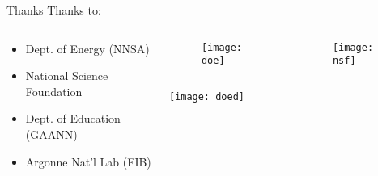 \begin{frame}{Thanks}
Thanks to:
\begin{columns}
  \begin{column}{.49\linewidth}
    \begin{itemize}
      \item Dept. of Energy (NNSA)
      \item National Science Foundation
      \item Dept. of Education (GAANN)
      \item Argonne Nat'l Lab (FIB)
    \end{itemize}
  \end{column}

  \begin{column}{.49\linewidth}
    \begin{columns}
      \begin{column}{1in}
        \begin{figure}
          \texttt{[image: doe]}
        \end{figure}
      \end{column}

      \begin{column}{1in}
        \begin{figure}
          \texttt{[image: nsf]}
        \end{figure}
      \end{column}
    \end{columns}
    \begin{center}
      \texttt{[image: doed]}
    \end{center}
  \end{column}
\end{columns}
\end{frame}

